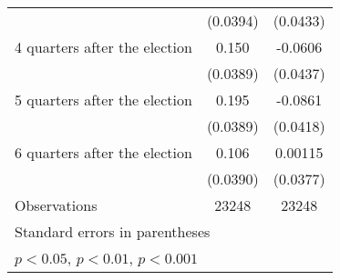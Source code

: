 \begin{table}[htbp]
\begin{tabular}{l*{2}{c}}
                    &    (0.0394)         &    (0.0433)         \\
[1em]
 4 quarters after the election&       0.150\sym{***}&     -0.0606         \\
                    &    (0.0389)         &    (0.0437)         \\
[1em]
 5 quarters after the election&       0.195\sym{***}&     -0.0861\sym{*}  \\
                    &    (0.0389)         &    (0.0418)         \\
[1em]
 6 quarters after the election&       0.106\sym{**} &     0.00115         \\
                    &    (0.0390)         &    (0.0377)         \\
\hline
Observations        &       23248         &       23248         \\
\hline\hline
\multicolumn{3}{l}{\footnotesize Standard errors in parentheses}\\
\multicolumn{3}{l}{\footnotesize \sym{*} \(p<0.05\), \sym{**} \(p<0.01\), \sym{***} \(p<0.001\)}\\
\end{tabular}
\end{table}
